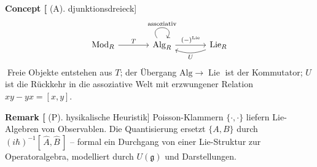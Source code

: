 \documentclass[10pt, letterpaper]{article}
\newcommand{\Mod}{\mathrm{Mod}}
\newcommand{\Alg}{\mathrm{Alg}}
\newcommand{\CustomHeading}[3]{%
  \par\medskip\noindent%
  \textbf{#1 #2} \textnormal{(#3)}.\enskip%
}
\newenvironment{REM}[2]{\begin{unitbox}\CustomHeading{Remark}{#1}{#2}}{\end{unitbox}}
\newenvironment{CONC}[2]{\begin{unitbox}\CustomHeading{Concept}{#1}{#2}}{\end{unitbox}}
\begin{document}
\begin{CONC}[Adjunktionsdreieck]
\[
\begin{tikzcd}[column sep=large]
\Mod_R \arrow[r, "T"] 
& \Alg_R \arrow[r, "(-)^{\operatorname{Lie}}"] \arrow[loop, distance=2em, in=55, out=125, "\text{assoziativ}"] 
& \operatorname{Lie}_R \arrow[l, bend left=20, "U"]
\end{tikzcd}
\]
\(\;\)Freie Objekte entstehen aus \(T\); der Übergang \(\Alg\to\operatorname{Lie}\) ist der Kommutator; \(U\) ist die Rückkehr in die assoziative Welt mit erzwungener Relation \(xy-yx=[x,y]\).
\end{CONC}

\begin{REM}[Physikalische Heuristik]
Poisson-Klammern \(\{\cdot,\cdot\}\) liefern Lie-Algebren von Observablen. Die Quantisierung ersetzt
\(\{A,B\}\) durch \((i\hbar)^{-1}[\,\hat A,\hat B\,]\) – formal ein Durchgang von einer
Lie-Struktur zur Operatoralgebra, modelliert durch \(U(\mathfrak{g})\) und Darstellungen.
\end{REM}




\pagebreak




\pagebreak


\printbibliography
\end{document}
